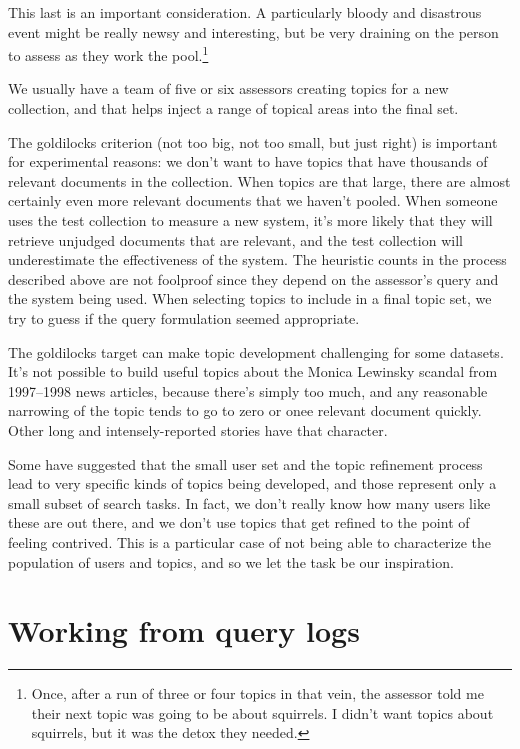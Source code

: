 \documentclass[nobib]{tufte-book}
\begin{document}
This last is an important consideration.  A particularly bloody and disastrous event might be really newsy and interesting, but  be very draining on the person to assess as they work the pool.\footnote{Once, after a run of three or four topics in that vein, the assessor told me their next topic was going to be about squirrels.  I didn't want topics about squirrels, but it was the detox they needed.}

We usually have a team of five or six assessors creating topics for a new collection, and that helps inject a range of topical areas into the final set.

The goldilocks criterion (not too big, not too small, but just right) is important for experimental reasons: we don't want to have topics that have thousands of relevant documents in the collection.  When topics are that large, there are almost certainly even more relevant documents that we haven't pooled.  When someone uses the test collection to measure a new system, it's more likely that they will retrieve unjudged documents that are relevant, and the test collection will underestimate the effectiveness of the system.  The heuristic counts in the process described above are not foolproof since they depend on the assessor's query and the system being used.  When selecting topics to include in a final topic set, we try to guess if the query formulation seemed appropriate.

The goldilocks target can make topic development challenging for some datasets.  It's not possible to build useful topics about the Monica Lewinsky scandal from 1997--1998 news articles, because there's simply too much, and any reasonable narrowing of the topic tends to go to zero or onee relevant document quickly.  Other long and intensely-reported stories have that character.

Some have suggested that the small user set and the topic refinement process lead to very specific kinds of topics being developed, and those represent only a small subset of search tasks.  In fact, we don't really know how many users like these are out there, and we don't use topics that get refined to the point of feeling contrived.  This is a particular case of not being able to characterize the population of users and topics, and so we let the task be our inspiration.

\section{Working from query logs}
\label{sec:query-logs}
\end{document}
